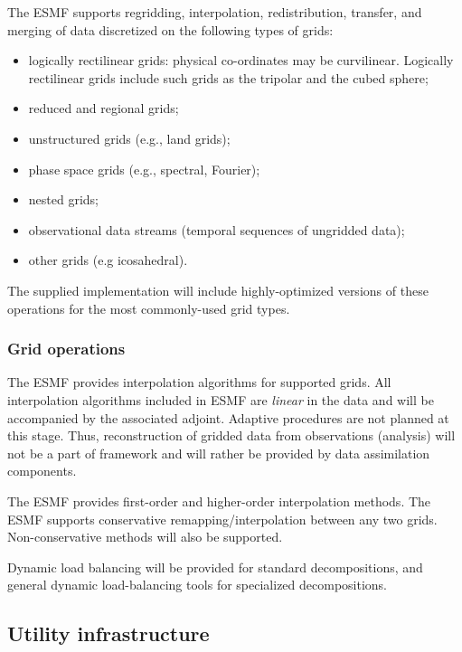 The ESMF supports regridding, interpolation, redistribution,
transfer, and merging of data discretized on the following types of grids:

\begin{itemize}
\item logically rectilinear grids: physical co-ordinates may be
  curvilinear. Logically rectilinear grids include such grids as the
  tripolar and the cubed sphere;
\item reduced and regional grids;
\item unstructured grids (e.g., land grids);
\item phase space grids (e.g., spectral, Fourier);
\item nested grids;
\item observational data streams (temporal sequences of ungridded data);
\item other grids (e.g icosahedral).
\end{itemize}

The supplied implementation will include highly-optimized versions of
these operations for the most commonly-used grid types.

\subsubsection{Grid operations}

The ESMF provides interpolation algorithms for supported grids.  All
interpolation algorithms included in ESMF are {\it linear} in the data
and will be accompanied by the associated adjoint.  Adaptive
procedures are not planned at this stage. Thus, reconstruction of
gridded data from observations (analysis) will not be a part of
framework and will rather be provided by data assimilation components.

The ESMF provides first-order and higher-order interpolation 
methods.  The ESMF supports conservative remapping/interpolation 
between any two grids. Non-conservative methods will also 
be supported.

Dynamic load balancing will be provided for standard decompositions, 
and general dynamic load-balancing tools for specialized decompositions.

\subsection{Utility infrastructure}

